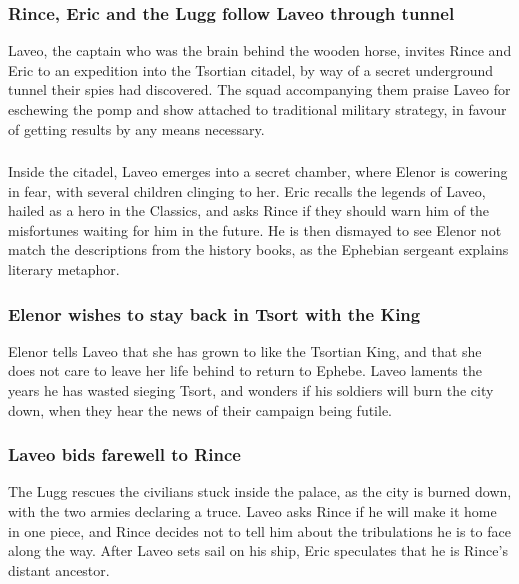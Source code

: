 \subsubsection{\Gls{Rince}, \Gls{Eric} and the \Gls{Lugg} follow \Gls{Laveo} through tunnel}
\Gls{Laveo}, the captain who was the brain behind the wooden horse, invites \Gls{Rince} and
\Gls{Eric} to an expedition into the Tsortian citadel, by way of a secret underground tunnel their
spies had discovered. The squad accompanying them praise \Gls{Laveo} for eschewing the pomp and show
attached to traditional military strategy, in favour of getting results by any means necessary.

\subsubsection{}
Inside the citadel, \Gls{Laveo} emerges into a secret chamber, where \Gls{Elenor} is cowering in
fear, with several children clinging to her. \Gls{Eric} recalls the legends of \Gls{Laveo}, hailed
as a hero in the Classics, and asks \Gls{Rince} if they should warn him of the misfortunes waiting
for him in the future. He is then dismayed to see \Gls{Elenor} not match the descriptions from the
history books, as the Ephebian sergeant explains literary metaphor.

\subsubsection{\Gls{Elenor} wishes to stay back in Tsort with the King}
\Gls{Elenor} tells \Gls{Laveo} that she has grown to like the Tsortian King, and that she does not
care to leave her life behind to return to Ephebe. \Gls{Laveo} laments the years he has wasted
sieging Tsort, and wonders if his soldiers will burn the city down, when they hear the news of their
campaign being futile.

\subsubsection{\Gls{Laveo} bids farewell to \Gls{Rince}}
The \Gls{Lugg} rescues the civilians stuck inside the palace, as the city is burned down, with the
two armies declaring a truce. \Gls{Laveo} asks \Gls{Rince} if he will make it home in one piece,
and \Gls{Rince} decides not to tell him about the tribulations he is to face along the way. After
\Gls{Laveo} sets sail on his ship, \Gls{Eric} speculates that he is \Gls{Rince}'s distant ancestor.

